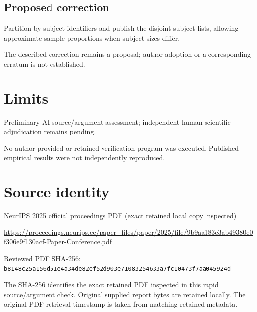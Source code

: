 \documentclass[11pt]{article}
\begin{document}
\subsection*{Proposed correction}

Partition by subject identifiers and publish the disjoint subject lists, allowing approximate sample proportions when subject sizes differ.

The described correction remains a proposal; author adoption or a corresponding erratum is not established.

\section*{Limits}

Preliminary AI source/argument assessment; independent human scientific adjudication remains pending.\par

No author-provided or retained verification program was executed. Published empirical results were not independently reproduced.\par

\section*{Source identity}

NeurIPS 2025 official proceedings PDF (exact retained local copy inspected)

\url{https://proceedings.neurips.cc/paper_files/paper/2025/file/9b9aa183c3ab49380e0f306e9f130acf-Paper-Conference.pdf}

Reviewed PDF SHA-256: \nolinkurl{b8148c25a156d51e4a34de82ef52d903e71083254633a7fc10473f7aa045924d}

The SHA-256 identifies the exact retained PDF inspected in this rapid source/argument check. Original supplied report bytes are retained locally. The original PDF retrieval timestamp is taken from matching retained metadata.
\end{document}
